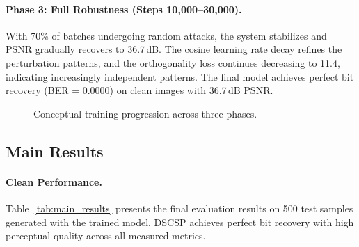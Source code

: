 \documentclass[10pt, twocolumn]{article}
\begin{document}
\paragraph{Phase 3: Full Robustness (Steps 10{,}000--30{,}000).}
With 70\% of batches undergoing random attacks, the system stabilizes and PSNR gradually recovers to 36.7\,dB.
The cosine learning rate decay refines the perturbation patterns, and the orthogonality loss continues decreasing to 11.4, indicating increasingly independent patterns.
The final model achieves perfect bit recovery (BER = 0.0000) on clean images with 36.7\,dB PSNR.

\begin{figure}[t]
\centering
{}
\caption{Conceptual training progression across three phases.}
\label{fig:training}
\end{figure}

\subsection{Main Results}
\label{sec:results}

\paragraph{Clean Performance.}
Table~\ref{tab:main_results} presents the final evaluation results on 500 test samples generated with the trained model.
DSCSP achieves perfect bit recovery with high perceptual quality across all measured metrics.
\end{document}
